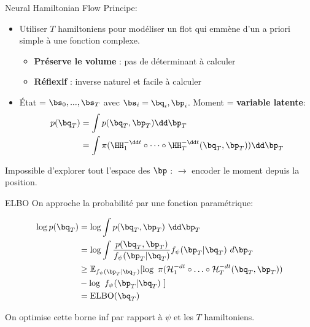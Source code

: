 \documentclass{beamer}
\begin{document}
\begin{frame}{Neural Hamiltonian Flow}
Principe: 
\begin{itemize}
\item Utiliser $T$ hamiltoniens pour modéliser un flot qui emmène d'un a priori simple à une fonction complexe.
\begin{itemize}
\item \textbf{Préserve le volume} : pas de déterminant à calculer
\item \textbf{Réflexif} : inverse naturel et facile à calculer 
\end{itemize}
\item État = $\bs_0, ..., \bs_T$ avec $\bs_i = \bq_i, \bp_i$. Moment = \textbf{variable latente}: 
\begin{align*}
p(\bq_T) &= \int p(\bq_T, \bp_T) \dd \bp_T \\
&= \int \pi(\HH_1^{-\dd t} \circ \dots \circ \HH_T^{-\dd t} (\bq_T, \bp_T)) \dd \bp_T
\end{align*}
\end{itemize}
Impossible d'explorer tout l'espace des $\bp$ : $\to$ encoder le moment depuis la position. 
\end{frame}

\begin{frame}{ELBO}
On approche la probabilité par une fonction paramétrique:

\begin{align*}
\log p(\bq_T) &= \log \int p(\bq_T, \bp_T) \ \dd\bp_T \\
    &= \log \int \frac{p(\bq_T, \bp_T)}{f_{\psi}(\bp_T | \bq_T)} f_{\psi}(\bp_T | \bq_T) \ d\bp_T \\
    &\geq  \mathbb{E}_{f_{\psi}(\bp_T | \bq_T)}[\log \ \pi ( \mathcal{H}_1^{-dt} \circ \ldots \circ \mathcal{H}_T^{-dt}(\bq_T, \bp_T) )  \\
    & - \log \ f_{\psi}(\bp_T | \bq_T)\ ] \\
    &= \text{ELBO}(\bq_T)
\end{align*}

On optimise cette borne inf par rapport à $\psi$ et les $T$ hamiltoniens.
\end{frame}
\end{document}
